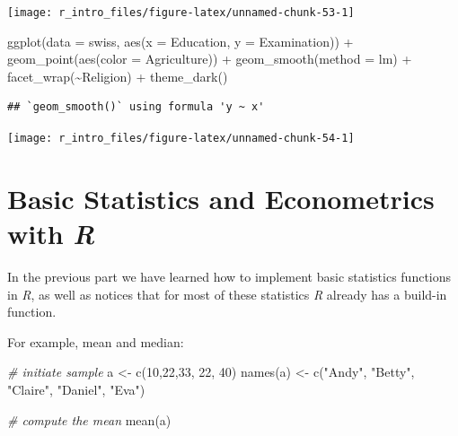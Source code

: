 \documentclass[
  12pt,
]{style/krantz}
\newenvironment{Shaded}{\begin{snugshade}}{\end{snugshade}}
\newcommand{\AttributeTok}[1]{\textcolor[rgb]{0.77,0.63,0.00}{#1}}
\newcommand{\CommentTok}[1]{\textcolor[rgb]{0.56,0.35,0.01}{\textit{#1}}}
\newcommand{\DecValTok}[1]{\textcolor[rgb]{0.00,0.00,0.81}{#1}}
\newcommand{\FunctionTok}[1]{\textcolor[rgb]{0.00,0.00,0.00}{#1}}
\newcommand{\NormalTok}[1]{#1}
\newcommand{\OtherTok}[1]{\textcolor[rgb]{0.56,0.35,0.01}{#1}}
\newcommand{\SpecialCharTok}[1]{\textcolor[rgb]{0.00,0.00,0.00}{#1}}
\newcommand{\StringTok}[1]{\textcolor[rgb]{0.31,0.60,0.02}{#1}}
\begin{document}
\texttt{[image: r\_intro\_files/figure-latex/unnamed-chunk-53-1]}

\begin{Shaded}
\begin{Highlighting}[]
\FunctionTok{ggplot}\NormalTok{(}\AttributeTok{data =}\NormalTok{ swiss, }\FunctionTok{aes}\NormalTok{(}\AttributeTok{x =}\NormalTok{ Education, }\AttributeTok{y =}\NormalTok{ Examination)) }\SpecialCharTok{+} 
     \FunctionTok{geom\_point}\NormalTok{(}\FunctionTok{aes}\NormalTok{(}\AttributeTok{color =}\NormalTok{ Agriculture)) }\SpecialCharTok{+}
     \FunctionTok{geom\_smooth}\NormalTok{(}\AttributeTok{method =} \StringTok{\textquotesingle{}lm\textquotesingle{}}\NormalTok{) }\SpecialCharTok{+}
     \FunctionTok{facet\_wrap}\NormalTok{(}\SpecialCharTok{\textasciitilde{}}\NormalTok{Religion) }\SpecialCharTok{+}
     \FunctionTok{theme\_dark}\NormalTok{()}
\end{Highlighting}
\end{Shaded}

\begin{verbatim}
## `geom_smooth()` using formula 'y ~ x'
\end{verbatim}

\texttt{[image: r\_intro\_files/figure-latex/unnamed-chunk-54-1]}

\hypertarget{basic-statistics-and-econometrics-with-r}{%
\section{\texorpdfstring{Basic Statistics and Econometrics with \emph{R}}{Basic Statistics and Econometrics with R}}\label{basic-statistics-and-econometrics-with-r}}

In the previous part we have learned how to implement basic statistics functions in \emph{R}, as well as notices that for most of these statistics \emph{R} already has a build-in function.

For example, mean and median:

\begin{Shaded}
\begin{Highlighting}[]
\CommentTok{\# initiate sample}
\NormalTok{a }\OtherTok{\textless{}{-}} \FunctionTok{c}\NormalTok{(}\DecValTok{10}\NormalTok{,}\DecValTok{22}\NormalTok{,}\DecValTok{33}\NormalTok{, }\DecValTok{22}\NormalTok{, }\DecValTok{40}\NormalTok{)}
\FunctionTok{names}\NormalTok{(a) }\OtherTok{\textless{}{-}} \FunctionTok{c}\NormalTok{(}\StringTok{"Andy"}\NormalTok{, }\StringTok{"Betty"}\NormalTok{, }\StringTok{"Claire"}\NormalTok{, }\StringTok{"Daniel"}\NormalTok{, }\StringTok{"Eva"}\NormalTok{)}

\CommentTok{\# compute the mean}
\FunctionTok{mean}\NormalTok{(a)}
\end{Highlighting}
\end{Shaded}
\end{document}
